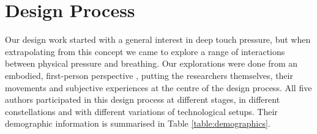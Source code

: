 

\section{Design Process}


Our design work started with a general interest in deep touch pressure, but when extrapolating from this concept we came to explore a range of interactions between physical pressure and breathing. Our explorations were done from an embodied, first-person perspective \cite{hook_embracing_2018}, putting the researchers themselves, their movements and subjective experiences at the centre of the design process. All five authors participated in this design process at different stages, in different constellations and with different variations of  technological setups. Their demographic information is summarised in Table \ref{table:demographics}. 
 
